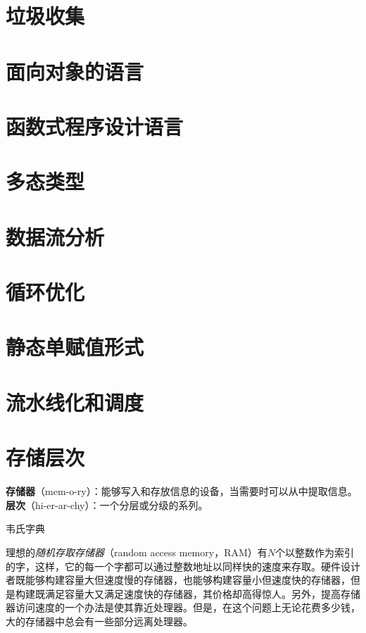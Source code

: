 \documentclass[cn,11pt,chinese]{elegantbook}
\begin{document}
\chapter{垃圾收集}

\chapter{面向对象的语言}

\chapter{函数式程序设计语言}

\chapter{多态类型}

\chapter{数据流分析}

\chapter{循环优化}

\chapter{静态单赋值形式}

\chapter{流水线化和调度}

\chapter{存储层次}

\epigraph{\textbf{存储器}（mem-o-ry）：能够写入和存放信息的设备，当需要时可以从中提取信息。\\\textbf{层次}（hi-er-ar-chy）：一个分层或分级的系列。}{韦氏字典}

理想的\textit{随机存取存储器}（random access memory，RAM）有$N$个以整数作为索引的字，这样，它的每一个字都可以通过整数地址以同样快的速度来存取。硬件设计者既能够构建容量大但速度慢的存储器，也能够构建容量小但速度快的存储器，但是构建既满足容量大又满足速度快的存储器，其价格却高得惊人。另外，提高存储器访问速度的一个办法是使其靠近处理器。但是，在这个问题上无论花费多少钱，大的存储器中总会有一些部分远离处理器。
\end{document}
